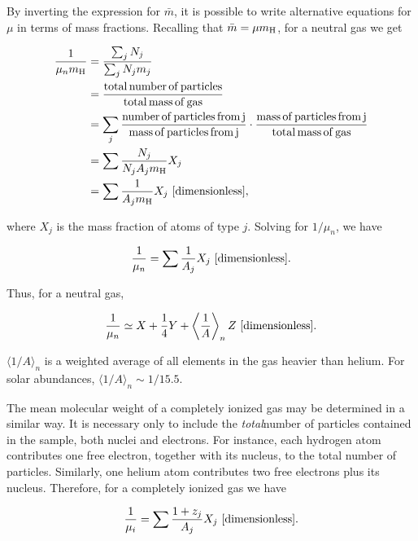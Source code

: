 \documentclass[a4paper,10pt]{article}
\begin{document}
{\noindent}By inverting the expression for $\bar{m}$, it is possible to write alternative equations for $\mu$ in terms of mass fractions. Recalling that $\bar{m}=\mu m_{\rm H}$, for a neutral gas we get

\begin{align*}
    \frac{1}{\mu_nm_{\rm H}} &= \dfrac{\sum_j N_j}{\sum_j N_jm_j} \\
    &= \frac{\rm total\,number\,of\,particles}{\rm total\,mass\,of\,gas} \\
    &= \sum_j \frac{\rm number\,of\,particles\,from\,j}{\rm mass\,of\,particles\,from\,j} \cdot \frac{\rm mass\,of\,particles\,from\,j}{\rm total\,mass\,of\,gas} \\
    &= \sum \frac{N_j}{N_jA_jm_{\rm H}} X_j \\
    &= \sum \frac{1}{A_jm_{\rm H}} X_j ~ [{\rm dimensionless}],
\end{align*}

{\noindent}where $X_j$ is the mass fraction of atoms of type $j$. Solving for $1/\mu_n$, we have

\begin{align*}
    \frac{1}{\mu_n} = \sum \frac{1}{A_j} X_j ~ [{\rm dimensionless}].
\end{align*}

{\noindent}Thus, for a neutral gas,

\begin{align*}
    \frac{1}{\mu_n} \simeq X + \frac{1}{4}Y + \left\langle\frac{1}{A}\right\rangle_n Z ~ [{\rm dimensionless}].
\end{align*}

{\noindent}$\langle1/A\rangle_n$ is a weighted average of all elements in the gas heavier than helium. For solar abundances, $\langle1/A\rangle_n\sim1/15.5$.

{\noindent}The mean molecular weight of a completely ionized gas may be determined in a similar way. It is necessary only to include the \textit{total}number of particles contained in the sample, both nuclei and electrons. For instance, each hydrogen atom contributes one free electron, together with its nucleus, to the total number of particles. Similarly, one helium atom contributes two free electrons plus its nucleus. Therefore, for a completely ionized gas we have

\begin{align*}
    \frac{1}{\mu_i} = \sum \frac{1+z_j}{A_j} X_j ~ [{\rm dimensionless}].
\end{align*}
\end{document}
